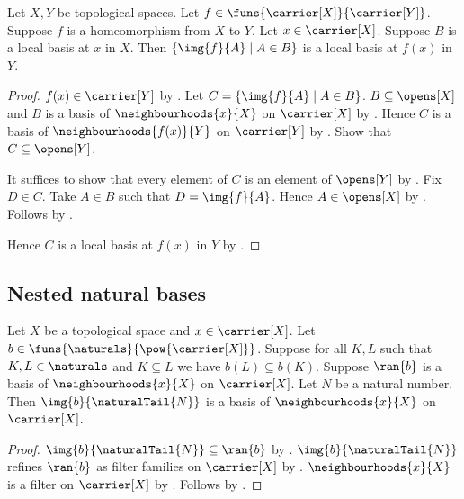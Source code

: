 \begin{corollary}\label{local_basis_homeomorphism_image}
    Let $X,Y$ be topological spaces.
    Let $f\in\funs{\carrier[X]}{\carrier[Y]}$.
    Suppose $f$ is a homeomorphism from $X$ to $Y$.
    Let $x\in\carrier[X]$.
    Suppose $B$ is a local basis at $x$ in $X$.
    Then $\{\img{f}{A}\mid A\in B\}$ is a local basis at $f(x)$ in $Y$.
\end{corollary}
\begin{proof}
    $f(x)\in\carrier[Y]$ by .
    Let $C=\{\img{f}{A}\mid A\in B\}$.
    $B\subseteq\opens[X]$ and
        $B$ is a basis of $\neighbourhoods{x}{X}$ on $\carrier[X]$
        by .
    Hence $C$ is a basis of $\neighbourhoods{f(x)}{Y}$ on $\carrier[Y]$
        by .
    Show that $C\subseteq\opens[Y]$.
    \begin{subproof}
        It suffices to show that every element of $C$ is an element of $\opens[Y]$
            by .
        Fix $D\in C$.
        Take $A\in B$ such that $D=\img{f}{A}$.
        Hence $A\in\opens[X]$ by .
        Follows by .
    \end{subproof}
    Hence $C$ is a local basis at $f(x)$ in $Y$
        by .
\end{proof}

\subsection{Nested natural bases}

\begin{corollary}\label{antitone_natural_tail_range_is_neighbourhood_filter_basis}
    Let $X$ be a topological space and $x\in\carrier[X]$.
    Let $b\in\funs{\naturals}{\pow{\carrier[X]}}$.
    Suppose for all $K,L$ such that $K,L\in\naturals$ and $K\subseteq L$
        we have $b(L)\subseteq b(K)$.
    Suppose $\ran{b}$ is a basis of $\neighbourhoods{x}{X}$
        on $\carrier[X]$.
    Let $N$ be a natural number.
    Then $\img{b}{\naturalTail{N}}$ is a basis of
        $\neighbourhoods{x}{X}$ on $\carrier[X]$.
\end{corollary}
\begin{proof}
    $\img{b}{\naturalTail{N}}\subseteq\ran{b}$
        by .
    $\img{b}{\naturalTail{N}}$ refines $\ran{b}$
        as filter families on $\carrier[X]$
        by .
    $\neighbourhoods{x}{X}$ is a filter on $\carrier[X]$
        by .
    Follows by .
\end{proof}
